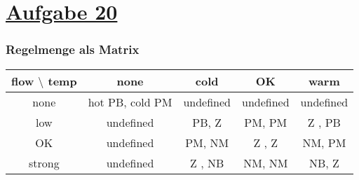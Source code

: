 \section*{\underline{Aufgabe 20}}


\subsubsection*{Regelmenge als Matrix}

\begin{tabular}{|c|c|c|c|c|}
\hline 
flow $\setminus$ temp & none            & cold      & OK        & warm \\
\hline
none                  & hot PB, cold PM & undefined & undefined & undefined \\
\hline
low                   & undefined       & PB, Z     & PM, PM    & Z , PB \\
\hline
OK                    & undefined       & PM, NM    & Z , Z     & NM, PM \\
\hline
strong                & undefined       & Z , NB    & NM, NM    & NB, Z \\
\hline 
\end{tabular} 